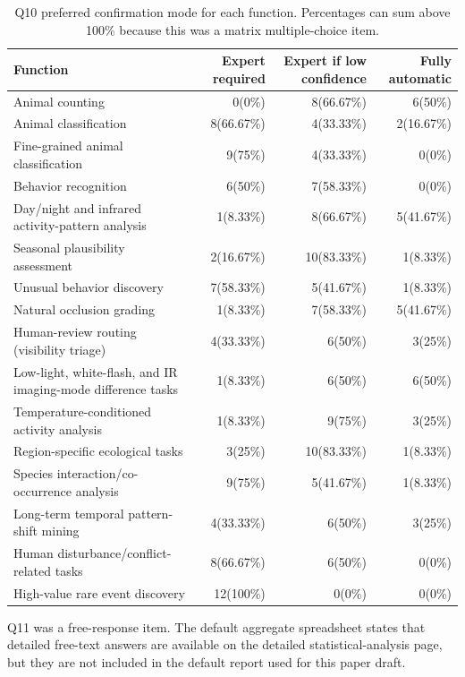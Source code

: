 \begin{table}[h]
\centering
\caption{Q10 preferred confirmation mode for each function. Percentages can sum above 100\% because this was a matrix multiple-choice item.}
\label{tab:questionnaire_expert_confirmation}
\scriptsize
\setlength{\tabcolsep}{3pt}
\begin{tabularx}{\textwidth}{Xrrr}
\toprule
Function & Expert required & Expert if low confidence & Fully automatic \\
\midrule
Animal counting & 0(0\%) & 8(66.67\%) & 6(50\%) \\
Animal classification & 8(66.67\%) & 4(33.33\%) & 2(16.67\%) \\
Fine-grained animal classification & 9(75\%) & 4(33.33\%) & 0(0\%) \\
Behavior recognition & 6(50\%) & 7(58.33\%) & 0(0\%) \\
Day/night and infrared activity-pattern analysis & 1(8.33\%) & 8(66.67\%) & 5(41.67\%) \\
Seasonal plausibility assessment & 2(16.67\%) & 10(83.33\%) & 1(8.33\%) \\
Unusual behavior discovery & 7(58.33\%) & 5(41.67\%) & 1(8.33\%) \\
Natural occlusion grading & 1(8.33\%) & 7(58.33\%) & 5(41.67\%) \\
Human-review routing (visibility triage) & 4(33.33\%) & 6(50\%) & 3(25\%) \\
Low-light, white-flash, and IR imaging-mode difference tasks & 1(8.33\%) & 6(50\%) & 6(50\%) \\
Temperature-conditioned activity analysis & 1(8.33\%) & 9(75\%) & 3(25\%) \\
Region-specific ecological tasks & 3(25\%) & 10(83.33\%) & 1(8.33\%) \\
Species interaction/co-occurrence analysis & 9(75\%) & 5(41.67\%) & 1(8.33\%) \\
Long-term temporal pattern-shift mining & 4(33.33\%) & 6(50\%) & 3(25\%) \\
Human disturbance/conflict-related tasks & 8(66.67\%) & 6(50\%) & 0(0\%) \\
High-value rare event discovery & 12(100\%) & 0(0\%) & 0(0\%) \\
\bottomrule
\end{tabularx}
\end{table}

Q11 was a free-response item. The default aggregate spreadsheet states that detailed free-text answers are available on the detailed statistical-analysis page, but they are not included in the default report used for this paper draft.

